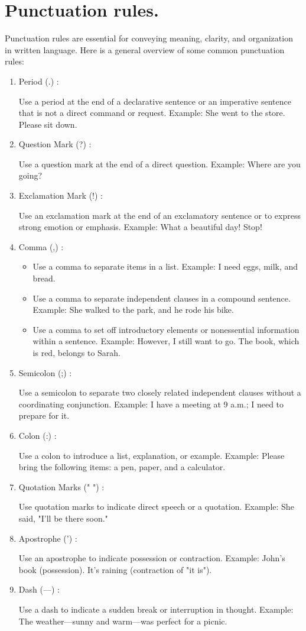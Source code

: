 \documentclass{article}
\begin{document}
\section*{Punctuation rules.}
Punctuation rules are essential for conveying meaning, clarity, and organization in written language. Here is a general overview of some common punctuation rules:
\begin{enumerate}
    \item Period (.) :

    Use a period at the end of a declarative sentence or an imperative sentence that is not a direct command or request.
    Example: She went to the store. Please sit down.
    \item Question Mark (?) :

    Use a question mark at the end of a direct question.
    Example: Where are you going?
    \item Exclamation Mark (!) :

    Use an exclamation mark at the end of an exclamatory sentence or to express strong emotion or emphasis.
    Example: What a beautiful day! Stop!
    \item Comma (,) :
    \begin{itemize}
        \item Use a comma to separate items in a list.
        Example: I need eggs, milk, and bread.
        
        \item Use a comma to separate independent clauses in a compound sentence.
        Example: She walked to the park, and he rode his bike.
        
        \item Use a comma to set off introductory elements or nonessential information within a sentence.
        Example: However, I still want to go. The book, which is red, belongs to Sarah.
    \end{itemize}
    \item Semicolon (;) :

    Use a semicolon to separate two closely related independent clauses without a coordinating conjunction.
    Example: I have a meeting at 9 a.m.; I need to prepare for it.
    \item Colon (:) :

    Use a colon to introduce a list, explanation, or example.
    Example: Please bring the following items: a pen, paper, and a calculator.
    \item Quotation Marks (" ") :

    Use quotation marks to indicate direct speech or a quotation.
    Example: She said, "I'll be there soon."
    \item Apostrophe (') :

    Use an apostrophe to indicate possession or contraction.
    Example: John's book (possession). It's raining (contraction of "it is").
    \item Dash (—) :

    Use a dash to indicate a sudden break or interruption in thought.
    Example: The weather—sunny and warm—was perfect for a picnic.
\end{enumerate}
\end{document}
